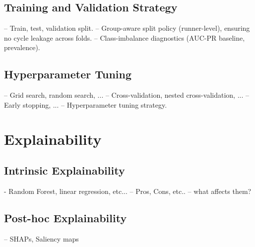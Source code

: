 \subsection{Training and Validation Strategy}\label{subsec:method-training-validation-strategy}
-- Train, test, validation split.
-- Group-aware split policy (runner-level), ensuring no cycle leakage across folds.
-- Class-imbalance diagnostics (AUC-PR baseline, prevalence).

\subsection{Hyperparameter Tuning}\label{subsec:method-hyperparameter-tuning}
-- Grid search, random search, ...
-- Cross-validation, nested cross-validation, ...
-- Early stopping, ...
-- Hyperparameter tuning strategy.


\section{Explainability}\label{sec:method-explainability}

\subsection{Intrinsic Explainability}\label{subsec:method-intrinsic-explainability}
- Random Forest, linear regression, etc...
-- Pros, Cons, etc..
-- what affects them?

\subsection{Post-hoc Explainability}\label{subsec:method-posthoc-explainability}
-- SHAPs, Saliency maps



